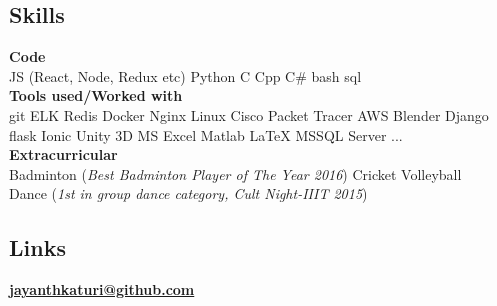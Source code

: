 \documentclass[letterpaper]{deedy-resume} %
\begin{document}

\lastupdated %



\begin{minipage}[t]{0.31\textwidth} %

\vspace{\topsep} %
\vspace{\topsep} %
\subsection{Skills}
\textbf{Code} \\
JS (React, Node, Redux etc) \textbullet{} Python \textbullet{} C \textbullet{} Cpp \textbullet{} C\# \textbullet{} bash \textbullet{} sql \\
\textbf{Tools used/Worked with} \\
git \textbullet{} ELK \textbullet{} Redis \textbullet{} Docker
\textbullet{} Nginx \textbullet{} Linux \textbullet{} Cisco Packet Tracer
\textbullet{} AWS \textbullet{} Blender 
\textbullet{} Django \textbullet{} flask \textbullet{} Ionic \textbullet{} Unity 3D
\textbullet{} MS Excel \textbullet{} Matlab \textbullet{} \LaTeX \textbullet{} MSSQL Server \space ... \\
\textbf{Extracurricular} \\
\textbullet{} Badminton (\textit{Best Badminton Player of The Year 2016}) \textbullet{}
Cricket \textbullet{} Volleyball \\
\textbullet{} Dance (\textit{1st in group dance category, Cult Night-IIIT 2015}) \\
\sectionspace

\subsection{Links} 
\href{https://github.com/jayanthkaturi}{\bf jayanthkaturi@github.com} \\
\sectionspace %


\end{minipage}
\end{document}
